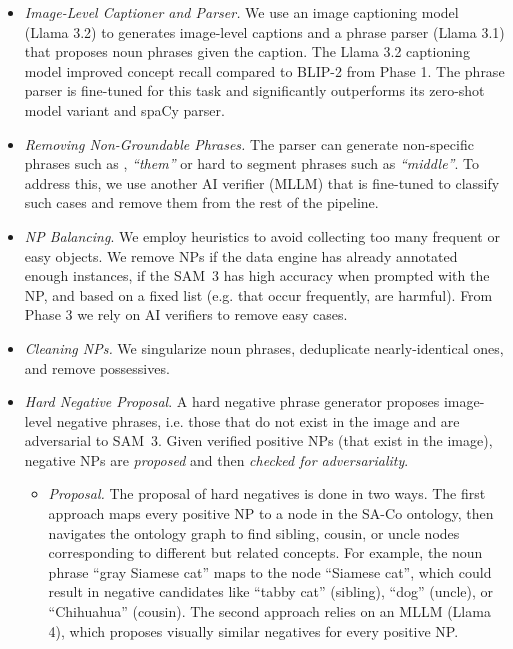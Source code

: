\documentclass[]{fairmeta}
\newcommand{\model}{SAM~3\xspace}
\newcommand{\dsname}{{SA-Co}\xspace}
\begin{document}
\begin{itemize}
	\item \textit{Image-Level Captioner and Parser.} We use an image captioning model (Llama 3.2) to generates image-level captions and a phrase parser (Llama 3.1) that proposes noun phrases given the caption. The Llama 3.2 captioning model improved concept recall compared to BLIP-2 from Phase 1. The phrase parser is fine-tuned for this task and significantly outperforms its zero-shot model variant and spaCy parser.
	
	\item \textit{Removing Non-Groundable Phrases.} The parser can generate non-specific phrases such as , \textit{``them''} or hard to segment phrases such as \textit{``middle''}. To address this, we use another AI verifier (MLLM) that is fine-tuned to classify such cases and remove them from the rest of the pipeline.
	
	\item \textit{NP Balancing}. We employ heuristics to avoid collecting too many frequent or easy objects. We remove NPs if the data engine has already annotated enough instances, if the \model has high accuracy when prompted with the NP, and based on a fixed list (e.g. that occur frequently, are harmful). From Phase 3 we rely on AI verifiers to remove easy cases.
	
	
	\item \textit{Cleaning NPs.} We singularize noun phrases, deduplicate nearly-identical ones, and remove possessives. 
	
	\item \textit{Hard Negative Proposal}. \label{hard_negatives} A hard negative phrase generator proposes image-level negative phrases, i.e. those that do not exist in the image and are adversarial to \model. Given verified positive NPs (\ie that exist in the image), negative NPs are \textit{proposed} and then \textit{checked for adversariality}.
	\begin{itemize}
		\item \textit{Proposal.} The proposal of hard negatives is done in two ways. The first approach maps every positive NP to a node in the \dsname ontology, then navigates the ontology graph to find sibling, cousin, or uncle nodes corresponding to different but related concepts. For example, the noun phrase ``gray Siamese cat'' maps to the node ``Siamese cat'', which could result in negative candidates like ``tabby cat'' (sibling), ``dog'' (uncle), or ``Chihuahua'' (cousin). The second approach relies on an MLLM (Llama 4), which proposes visually similar negatives for every positive NP.
		

\end{itemize}
\end{itemize}
\end{document}
